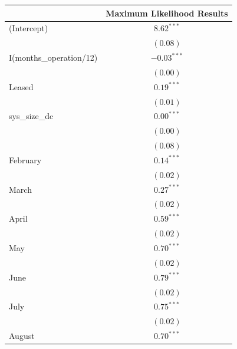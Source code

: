 \documentclass[12pt]{article}
\begin{document}
\begin{table}
\begin{center}
\begin{tabular}{l c }
\hline
 & Maximum Likelihood Results\\
\hline
(Intercept)                                            & $8.62^{***}$  \\
                                                       & $(0.08)$      \\
I(months\_operation/12)                                & $-0.03^{***}$ \\
                                                       & $(0.00)$      \\
Leased                         & $0.19^{***}$  \\
                                                       & $(0.01)$      \\
sys\_size\_dc                                          & $0.00^{***}$  \\
                                                       & $(0.00)$      \\        & $(0.08)$      \\
February                                         & $0.14^{***}$  \\
                                                       & $(0.02)$      \\
March                                        & $0.27^{***}$  \\
                                                       & $(0.02)$      \\
April                                        & $0.59^{***}$  \\
                                                       & $(0.02)$      \\
May                                         & $0.70^{***}$  \\
                                                       & $(0.02)$      \\
June                                         & $0.79^{***}$  \\
                                                       & $(0.02)$      \\
July                                         & $0.75^{***}$  \\
                                                       & $(0.02)$      \\
August                                         & $0.70^{***}$  \\

\end{tabular}
\end{center}
\end{table}
\end{document}
